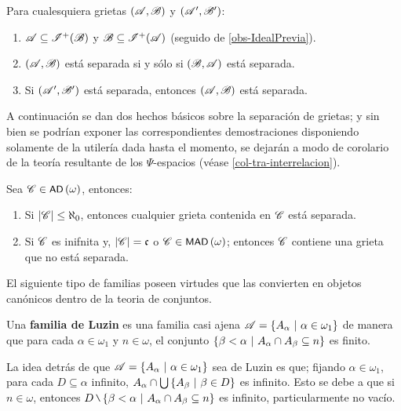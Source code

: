 	\begin{observacion}\label{obs-GrietasSimple}
		Para cualesquiera grietas $(\mathscr{A},\mathscr{B})$ y $(\mathscr{A}',\mathscr{B}')$:
		\begin{enumerate}
			\item $\mathscr{A} \subseteq \mathscr{I}^+(\mathscr{B})$ y $\mathscr{B} \subseteq \mathscr{I}^+(\mathscr{A})$ (seguido de \autoref{obs-IdealPrevia}).
			\item $(\mathscr{A},\mathscr{B})$ está separada si y sólo si $(\mathscr{B},\mathscr{A})$ está separada.
			\item Si $(\mathscr{A}',\mathscr{B}')$ está separada, entonces $(\mathscr{A},\mathscr{B})$ está separada.
		\end{enumerate}
	\end{observacion}

	A continuación se dan dos hechos básicos sobre la separación de grietas; y sin bien se podrían exponer las correspondientes demostraciones disponiendo solamente de la utilería dada hasta el momento, se dejarán a modo de corolario de la teoría resultante de los $\Psi$-espacios (véase \ref{col-tra-interrelacion}).

	\begin{ejemplo}\label{ej-interrelacion}
		Sea $\mathscr{C}\in \operatorname{\text{\textsf{\small AD}}}\,(\omega)$, entonces:
        \begin{enumerate}
            \item Si $|\mathscr{C}|\leq \aleph_0$, entonces cualquier grieta contenida en $\mathscr{C}$ está separada.
            \item Si $\mathscr{C}$ es inifnita y, $|\mathscr{C}|=\mathfrak{c}$ o $\mathscr{C}\in \operatorname{\text{\textsf{\small MAD}}}\,(\omega)$; entonces $\mathscr{C}$ contiene una grieta que no está separada.
        \end{enumerate}
	\end{ejemplo}

	El siguiente tipo de familias poseen virtudes que las convierten en objetos canónicos dentro de la teoria  de conjuntos.

	\begin{definicion}\label{def-LuzinFam}
		Una \textbf{familia de Luzin} es una familia casi ajena $\mathscr{A}=\{A_\alpha \text{ $|$ } \alpha \in \omega_1 \}$ de manera que para cada $\alpha \in \omega_1$ y $n \in \omega$, el conjunto $ \{ \beta<\alpha \text{ $|$ } A_\alpha \cap A_\beta \subseteq n \} $ es finito.
	\end{definicion}

	La idea detrás de que $\mathscr{A}=\{A_\alpha \text{ $|$ } \alpha \in \omega_1 \}$ sea de Luzin es que; fijando $\alpha \in \omega_1$, para cada $D \subseteq \alpha$ infinito, $A_\alpha \cap \mbox{$\bigcup$}\,\{A_\beta \text{ $|$ } \beta \in D\}$ es infinito. Esto se debe a que si $n \in \omega$, entonces $D \setminus \{ \beta<\alpha \tq A_\alpha \cap A_\beta \subseteq n \} $ es infinito, particularmente no vacío.

